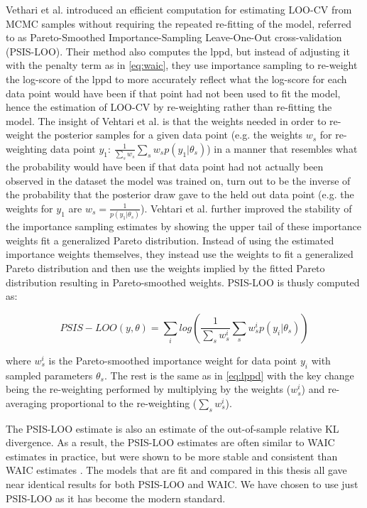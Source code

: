 Vethari et al. \cite{Vehtari2016} introduced an efficient computation for estimating LOO-CV from MCMC samples without requiring the repeated re-fitting of the model, referred to as Pareto-Smoothed Importance-Sampling Leave-One-Out cross-validation (PSIS-LOO). Their method also computes the lppd, but instead of adjusting it with the penalty term as in \ref{eq:waic}, they use importance sampling to re-weight the log-score of the lppd to more accurately reflect what the log-score for each data point would have been if that point had not been used to fit the model, hence the estimation of LOO-CV by re-weighting rather than re-fitting the model. The insight of Vehtari et al. is that the weights needed in order to re-weight the posterior samples for a given data point (e.g. the weights $w_s$ for re-weighting data point $y_1$: $\frac{1}{\sum_s w_s} \sum_s w_s p(y_1 | \theta_s)$) in a manner that resembles what the probability would have been if that data point had not actually been observed in the dataset the model was trained on, turn out to be the inverse of the probability that the posterior draw gave to the held out data point (e.g. the weights for $y_1$ are $w_s = \frac{1}{p(y_1|\theta_s)}$). Vehtari et al. further improved the stability of the importance sampling estimates by showing the upper tail of these importance weights fit a generalized Pareto distribution. Instead of using the estimated importance weights themselves, they instead use the weights to fit a generalized Pareto distribution and then use the weights implied by the fitted Pareto distribution resulting in Pareto-smoothed weights. PSIS-LOO is thusly computed as:

\begin{equation} \label{eq:psis-loo}
PSIS-LOO(y, \theta) = \sum_i log \left( \frac{1}{\sum_s w_s^i} \sum_s w_s^i p(y_i | \theta_s) \right)
\end{equation}

where $w_s^i$ is the Pareto-smoothed importance weight for data point $y_i$ with sampled parameters $\theta_s$. The rest is the same as in \ref{eq:lppd} with the key change being the re-weighting performed by multiplying by the weights ($w_s^i$) and re-averaging proportional to the re-weighting ($\sum_s w_s^i$).

The PSIS-LOO estimate is also an estimate of the out-of-sample relative KL divergence. As a result, the PSIS-LOO estimates are often similar to WAIC estimates in practice, but were shown to be more stable and consistent than WAIC estimates \cite{Vehtari2016}. The models that are fit and compared in this thesis all gave near identical results for both PSIS-LOO and WAIC. We have chosen to use just PSIS-LOO as it has become the modern standard.

